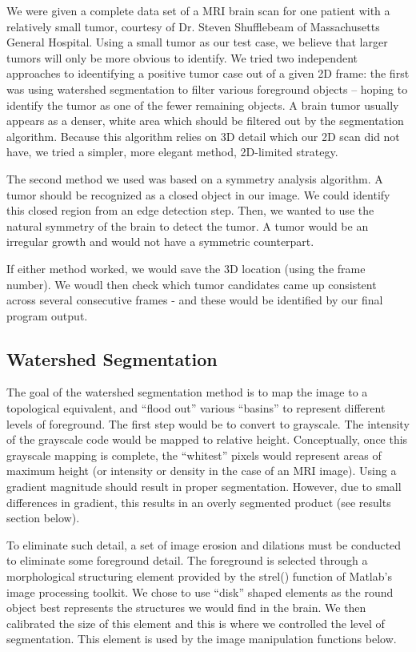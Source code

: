 \documentclass[12pt]{article}
\theoremstyle{plain}%
\theoremstyle{definition}
\theoremstyle{remark}
\begin{document}
We were given a complete data set of a MRI brain scan for one patient with a relatively small tumor, courtesy of Dr. Steven Shufflebeam of Massachusetts General Hospital.  Using a small tumor as our test case, we believe that larger tumors will only be more obvious to identify.
We tried two independent approaches to ideentifying a positive tumor case out of a given 2D frame: the first was using watershed segmentation to filter various foreground objects – hoping to identify the tumor as one of the fewer remaining objects.  A brain tumor usually appears as a denser, white area which should be filtered out by the segmentation algorithm.  Because this algorithm relies on 3D detail which our 2D scan did not have, we tried a simpler, more elegant method, 2D-limited strategy.

The second method we used was based on a symmetry analysis algorithm.  A tumor should be recognized as a closed object in our image.  We could identify this closed region from an edge detection step.  Then, we wanted to use the natural symmetry of the brain to detect the tumor.  A tumor would be an irregular growth and would not have a symmetric counterpart.

If either method worked, we would save the 3D location (using the frame number).  We woudl then check which tumor candidates came up consistent across several consecutive frames - and these would be identified by our final program output.
\subsection{Watershed Segmentation}

The goal of the watershed segmentation method is to map the image to a topological equivalent, and “flood out” various “basins” to represent different levels of foreground.  The first step would be to convert to grayscale.  The intensity of the grayscale code would be mapped to relative height.  Conceptually, once this grayscale mapping is complete, the “whitest” pixels would represent areas of maximum height (or intensity or density in the case of an MRI image).  Using a gradient magnitude should result in proper segmentation.  However, due to small differences in gradient, this results in an overly segmented product (see results section below).

To eliminate such detail, a set of image erosion and dilations must be conducted to eliminate some foreground detail.  The foreground is selected through a morphological structuring element provided by the strel() function of Matlab’s image processing toolkit.  We chose to use “disk” shaped elements as the round object best represents the structures we would find in the brain.  We then calibrated the size of this element and this is where we controlled the level of segmentation.  This element is used by the image manipulation functions below.
\end{document}
